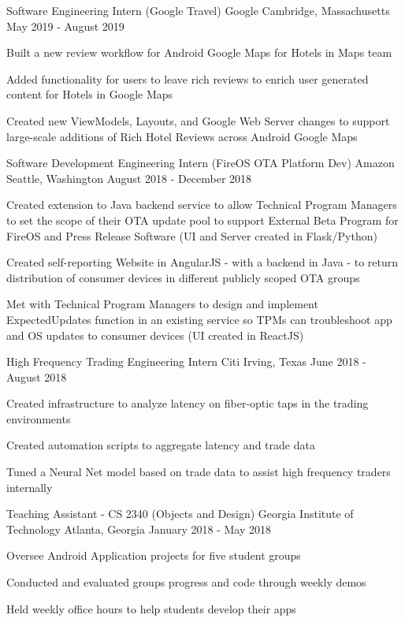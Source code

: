 \documentclass[
    changecolor={0, 38, 58},
]{pranav-resume}
\begin{document}
\cventry
  {Software Engineering Intern (Google Travel)}
  {Google}
  {Cambridge, Massachusetts}
  {May 2019 - August 2019}
  {
    \begin{cvitems}
        \item {Built a new review workflow for Android Google Maps for Hotels in Maps team}
        \item {Added functionality for users to leave rich reviews to enrich user generated content for Hotels in Google Maps}
        \item {Created new ViewModels, Layouts, and Google Web Server changes to support large-scale additions of Rich Hotel Reviews across Android Google Maps}
  \end{cvitems}
  }
\cventry
  {Software Development Engineering Intern (FireOS OTA Platform Dev)}
  {Amazon}
  {Seattle, Washington}
  {August 2018 - December 2018}
  {
    \begin{cvitems}
     	 \item {Created extension to Java backend service to allow Technical Program Managers to set the scope of their OTA update pool to support External Beta Program for FireOS and Press Release Software (UI and Server created in Flask/Python) }
	\item {Created self-reporting Website in AngularJS - with a backend in Java - to return distribution of consumer devices in different publicly scoped OTA groups }
	\item {Met with Technical Program Managers to design and implement ExpectedUpdates function in an existing service so TPMs can troubleshoot app and OS updates to consumer devices (UI created in ReactJS)}
    \end{cvitems}
  }
\cventry
  {High Frequency Trading Engineering Intern}
  {Citi}
  {Irving, Texas}
  {June 2018 - August 2018}
  {
    \begin{cvitems}
	\item{Created infrastructure to analyze latency on fiber-optic taps in the trading environments}
	\item{Created automation scripts to aggregate latency and trade data}
	\item{Tuned a Neural Net model based on trade data to assist high frequency traders internally}
    \end{cvitems}
  }
\cventry
  {Teaching Assistant - CS 2340 (Objects and Design)}
  {Georgia Institute of Technology}
  {Atlanta, Georgia}
  {January 2018 - May 2018}
  {
    \begin{cvitems}
      \item {Oversee Android Application projects for five student groups}
      \item {Conducted and evaluated groups progress and code through weekly demos}
      \item{Held weekly office hours to help students develop their apps}
    \end{cvitems}
  }
\end{document}
